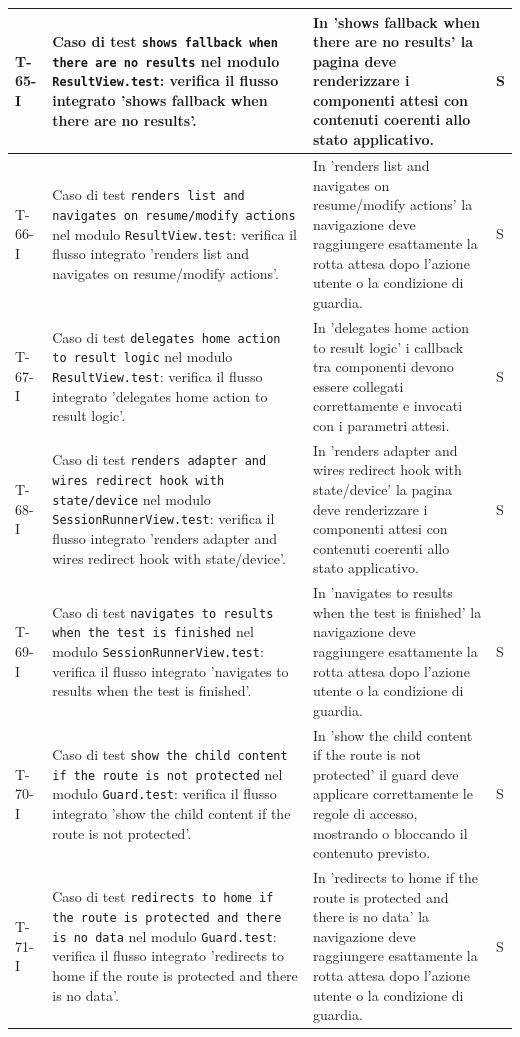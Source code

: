 \documentclass[a4paper,12pt]{article}
\begin{document}
{{\begin{longtable}{|>{\RaggedRight\arraybackslash}p{1.55cm}|>{\RaggedRight\arraybackslash}p{8.0cm}|>{\RaggedRight\arraybackslash}p{4.6cm}|>{\RaggedRight\arraybackslash}p{1.2cm}|}
        \hline
        T-65-I & Caso di test \texttt{shows fallback when there are no results} nel modulo \texttt{ResultView.test}: verifica il flusso integrato 'shows fallback when there are no results'. & In 'shows fallback when there are no results' la pagina deve renderizzare i componenti attesi con contenuti coerenti allo stato applicativo. & S \\
        \hline
        T-66-I & Caso di test \texttt{renders list and navigates on resume/modify actions} nel modulo \texttt{ResultView.test}: verifica il flusso integrato 'renders list and navigates on resume/modify actions'. & In 'renders list and navigates on resume/modify actions' la navigazione deve raggiungere esattamente la rotta attesa dopo l'azione utente o la condizione di guardia. & S \\
        \hline
        T-67-I & Caso di test \texttt{delegates home action to result logic} nel modulo \texttt{ResultView.test}: verifica il flusso integrato 'delegates home action to result logic'. & In 'delegates home action to result logic' i callback tra componenti devono essere collegati correttamente e invocati con i parametri attesi. & S \\
        \hline
        T-68-I & Caso di test \texttt{renders adapter and wires redirect hook with state/device} nel modulo \texttt{SessionRunnerView.test}: verifica il flusso integrato 'renders adapter and wires redirect hook with state/device'. & In 'renders adapter and wires redirect hook with state/device' la pagina deve renderizzare i componenti attesi con contenuti coerenti allo stato applicativo. & S \\
        \hline
        T-69-I & Caso di test \texttt{navigates to results when the test is finished} nel modulo \texttt{SessionRunnerView.test}: verifica il flusso integrato 'navigates to results when the test is finished'. & In 'navigates to results when the test is finished' la navigazione deve raggiungere esattamente la rotta attesa dopo l'azione utente o la condizione di guardia. & S \\
        \hline
        T-70-I & Caso di test \texttt{show the child content if the route is not protected} nel modulo \texttt{Guard.test}: verifica il flusso integrato 'show the child content if the route is not protected'. & In 'show the child content if the route is not protected' il guard deve applicare correttamente le regole di accesso, mostrando o bloccando il contenuto previsto. & S \\
        \hline
        T-71-I & Caso di test \texttt{redirects to home if the route is protected and there is no data} nel modulo \texttt{Guard.test}: verifica il flusso integrato 'redirects to home if the route is protected and there is no data'. & In 'redirects to home if the route is protected and there is no data' la navigazione deve raggiungere esattamente la rotta attesa dopo l'azione utente o la condizione di guardia. & S \\

\end{longtable}}}
\end{document}
